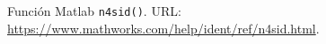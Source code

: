 


















Función Matlab \texttt{n4sid()}. URL: \url{https://www.mathworks.com/help/ident/ref/n4sid.html}.
